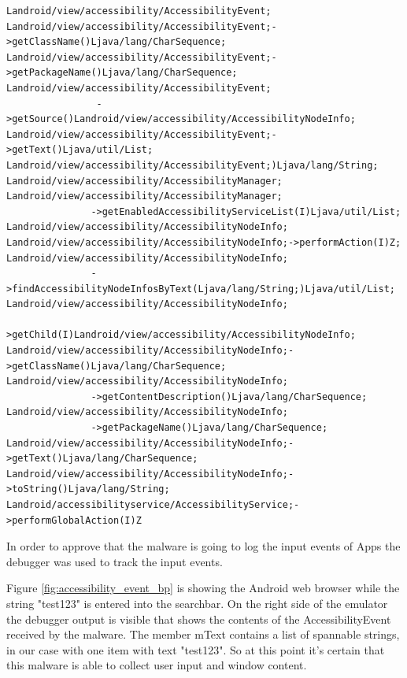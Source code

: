 \documentclass[10pt,titlepage]{article}
\begin{document}
\begin{lstlisting}[label=listofaccessibilitycalls,caption=List of calls to the Accessibility framework of Android. The malware is searching for UI widgests as well as performs global actions (can dismiss Activities like Settings) and gather text entered into UI widgets.,frame=tb]
Landroid/view/accessibility/AccessibilityEvent;
Landroid/view/accessibility/AccessibilityEvent;->getClassName()Ljava/lang/CharSequence;
Landroid/view/accessibility/AccessibilityEvent;->getPackageName()Ljava/lang/CharSequence;
Landroid/view/accessibility/AccessibilityEvent;
                ->getSource()Landroid/view/accessibility/AccessibilityNodeInfo;
Landroid/view/accessibility/AccessibilityEvent;->getText()Ljava/util/List;
Landroid/view/accessibility/AccessibilityEvent;)Ljava/lang/String;
Landroid/view/accessibility/AccessibilityManager;
Landroid/view/accessibility/AccessibilityManager;
               ->getEnabledAccessibilityServiceList(I)Ljava/util/List;
Landroid/view/accessibility/AccessibilityNodeInfo;
Landroid/view/accessibility/AccessibilityNodeInfo;->performAction(I)Z;
Landroid/view/accessibility/AccessibilityNodeInfo;
               ->findAccessibilityNodeInfosByText(Ljava/lang/String;)Ljava/util/List;
Landroid/view/accessibility/AccessibilityNodeInfo;
                >getChild(I)Landroid/view/accessibility/AccessibilityNodeInfo;
Landroid/view/accessibility/AccessibilityNodeInfo;->getClassName()Ljava/lang/CharSequence;
Landroid/view/accessibility/AccessibilityNodeInfo;
               ->getContentDescription()Ljava/lang/CharSequence;
Landroid/view/accessibility/AccessibilityNodeInfo;
               ->getPackageName()Ljava/lang/CharSequence;
Landroid/view/accessibility/AccessibilityNodeInfo;->getText()Ljava/lang/CharSequence;
Landroid/view/accessibility/AccessibilityNodeInfo;->toString()Ljava/lang/String;
Landroid/accessibilityservice/AccessibilityService;->performGlobalAction(I)Z
\end{lstlisting}

In order to approve that the malware is going to log the input events of Apps the debugger was used to track the input events.

Figure \ref{fig:accessibility_event_bp} is showing the Android web browser while the string "test123" is entered into the searchbar. On the right side of the emulator the debugger output is visible that shows the contents of the AccessibilityEvent received by the malware. The member mText contains a list of spannable strings, in our case with one item with text "test123". So at this point it's certain that this malware is able to collect user input and window content.
\end{document}

